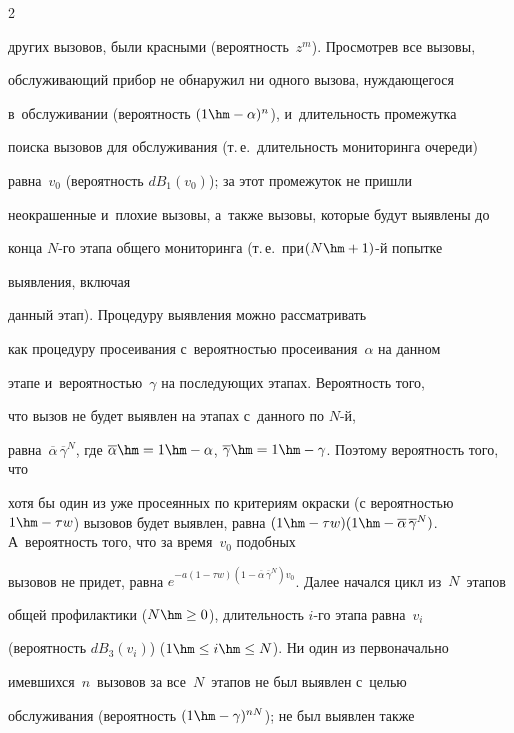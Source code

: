 \begin{multicols}{2}
\begin{enumerate}
других вызовов, были красными (вероятность~$z^m$). Просмотрев все вызовы, 


обслуживающий прибор не обнаружил ни одного вызова, нуждающегося 


в~обслуживании (вероятность $(1\hm-\alpha)^n$), и~длительность промежутка 


поиска вызовов для обслуживания (т.\,е.\ длительность мониторинга очереди) 


равна~$v_0$ (вероятность $dB_1(v_0)$); за этот промежуток не пришли 


неокрашенные и~плохие вызовы, а~также вызовы, которые будут выявлены до 


конца $N$-го этапа общего мониторинга (т.\,е.\ при\linebreak $(N\hm+1)$-й попытке 


выявления, включая\linebreak


 данный этап). Процедуру выявления можно рас\-смат\-ри\-вать 


как процедуру просеивания с~ве\-ро\-ят\-ностью просеивания~$\alpha$ на данном 


этапе и~вероятностью~$\gamma$ на последующих этапах. \mbox{Вероятность} того, 


что вызов не будет выявлен на этапах с~данного по $N$-й, 


равна~$\overline{\alpha}\,\overline{\gamma}^N$, где $\overline{\alpha}\hm=1\hm-


\alpha$, $\overline{\gamma}\hm= 1\hm-\gamma$. Поэтому вероятность того, что 


хотя бы один из уже просеянных по критериям окраски (с вероятностью $1\hm- 


\tau w$) вызовов будет выявлен, равна $(1\hm-\tau w) (1\hm- \overline{\alpha}\, 


\overline{\gamma}^N)$. А~вероятность того, что за время~$v_0$ подобных 


вызовов не придет, равна $e^{-a(1-\tau w)(1-


\overline{\alpha}\,\overline{\gamma}^N)v_0}$. Далее начался цикл из~$N$~этапов 


общей профилактики ($N\hm\geq0$), длительность $i$-го этапа равна~$v_i$ 


(вероятность $dB_3(v_i)$) ($1\hm\leq i\hm\leq N$). Ни один из первоначально 


имевшихся~$n$~вызовов за все~$N$~этапов не был выявлен с~целью 


обслуживания (вероятность $(1\hm- \gamma)^{nN}$); не был выявлен также 



\end{enumerate}
\end{multicols}
